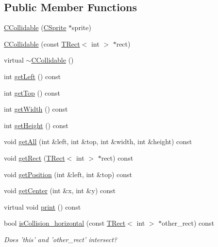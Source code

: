 \subsection*{Public Member Functions}
\begin{DoxyCompactItemize}
\item 
\hyperlink{classengine_1_1CCollidable_af462862c9147ddecb794456bac7d24af}{C\-Collidable} (\hyperlink{classCSprite}{C\-Sprite} $\ast$sprite)
\item 
\hyperlink{classengine_1_1CCollidable_a0cf5d0adac82ce344fa0a9944739d87b}{C\-Collidable} (const \hyperlink{classengine_1_1TRect}{T\-Rect}$<$ int $>$ $\ast$rect)
\item 
virtual \hyperlink{classengine_1_1CCollidable_aab6e393808cd5f3a6144889df36e9523}{$\sim$\-C\-Collidable} ()
\item 
int \hyperlink{classengine_1_1CCollidable_a4144d3b4711ae7570f6b122e5b4e1435}{get\-Left} () const 
\item 
int \hyperlink{classengine_1_1CCollidable_adb2d96cc98dc4b6ed5a26cd9129e1d2d}{get\-Top} () const 
\item 
int \hyperlink{classengine_1_1CCollidable_afba2923113db4ebde67912978885ec72}{get\-Width} () const 
\item 
int \hyperlink{classengine_1_1CCollidable_a6436c774e28bcbee83472f91c059283a}{get\-Height} () const 
\item 
void \hyperlink{classengine_1_1CCollidable_a0945e8a00846ff20ecdd86102afe04aa}{get\-All} (int \&left, int \&top, int \&width, int \&height) const 
\item 
void \hyperlink{classengine_1_1CCollidable_ae026a66abb2bfa169227255335d9f78b}{get\-Rect} (\hyperlink{classengine_1_1TRect}{T\-Rect}$<$ int $>$ $\ast$rect) const 
\item 
void \hyperlink{classengine_1_1CCollidable_a60fa629f81692094f135d01c2a4f5b69}{get\-Position} (int \&left, int \&top) const 
\item 
void \hyperlink{classengine_1_1CCollidable_a1855752c68f9d17856ce6c48234818fc}{get\-Center} (int \&x, int \&y) const 
\item 
virtual void \hyperlink{classengine_1_1CCollidable_a94c0157c8fdd9fccbfe8cdd726da2473}{print} () const 
\item 
bool \hyperlink{classengine_1_1CCollidable_a1eca3fcd9ed995b5e2d7ea4d1c6d6a60}{is\-Collision\-\_\-horizontal} (const \hyperlink{classengine_1_1TRect}{T\-Rect}$<$ int $>$ $\ast$other\-\_\-rect) const 
\begin{DoxyCompactList}\small\item\em Does 'this' and 'other\-\_\-rect' intersect? \end{DoxyCompactList}\item 

\end{DoxyCompactItemize}

